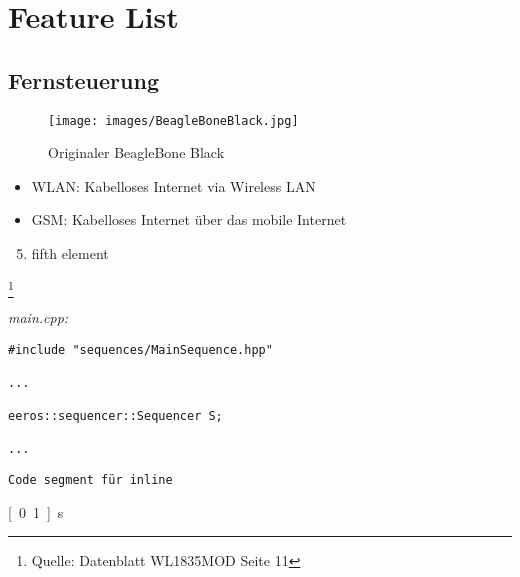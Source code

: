 


\chapter{Feature List}
\section{Fernsteuerung}


\begin{figure}[!ht]
\centering
\texttt{[image: images/BeagleBoneBlack.jpg]}
\caption{Originaler BeagleBone Black}
\label{fig:BeagleBoneBlack}
\end{figure}


\begin{itemize}
\item WLAN: Kabelloses Internet via Wireless LAN
\item GSM: Kabelloses Internet über das mobile Internet
\end{itemize}


\begin{enumerate}
  \setcounter{enumi}{4}
  \item fifth element
\end{enumerate}

\footnote{Quelle: Datenblatt WL1835MOD Seite 11}

\-\hspace{2cm}

\textit{main.cpp:}\
\begin{lstlisting}
#include "sequences/MainSequence.hpp"

...

eeros::sequencer::Sequencer S;

...
\end{lstlisting}


\texttt{Code segment für inline} 


\usepackage{units}
\unit[0.1]{s}
